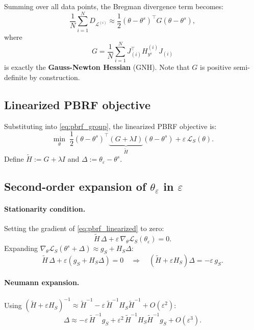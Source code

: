 \documentclass{article}
\theoremstyle{plain}
\theoremstyle{definition}
\theoremstyle{remark}
\begin{document}
Summing over all data points, the Bregman divergence term becomes:
\[
\frac{1}{N}\sum_{i=1}^{N} D_{\mathcal{L}^{(i)}} \approx \frac{1}{2}(\theta - \theta^s)^\top G (\theta - \theta^s),
\]
where
\begin{equation}
G = \frac{1}{N}\sum_{i=1}^{N} J_{(i)}^\top H_{y^s}^{(i)} J_{(i)}
\label{eq:gnh_from_bregman}
\end{equation}
is exactly the \textbf{Gauss-Newton Hessian} (GNH).
Note that $G$ is positive semi-definite by construction.

\subsection{Linearized PBRF objective}

Substituting into \eqref{eq:pbrf_group}, the linearized PBRF objective is:
\begin{equation}
\min_{\theta} \;\frac{1}{2}(\theta - \theta^s)^\top \underbrace{(G + \lambda I)}_{\tilde{H}} (\theta - \theta^s)
+ \varepsilon\,\mathcal{L}_S(\theta).
\label{eq:pbrf_linearized}
\end{equation}
Define $\tilde{H} := G + \lambda I$ and $\Delta := \theta_\varepsilon - \theta^s$.

\subsection{Second-order expansion of $\theta_\varepsilon$ in $\varepsilon$}

\paragraph{Stationarity condition.}
Setting the gradient of \eqref{eq:pbrf_linearized} to zero:
\[
\tilde{H}\,\Delta + \varepsilon\,\nabla_\theta \mathcal{L}_S(\theta_\varepsilon) = 0.
\]
Expanding $\nabla_\theta \mathcal{L}_S(\theta^s + \Delta) \approx g_S + H_S \Delta$:
\[
\tilde{H}\,\Delta + \varepsilon(g_S + H_S \Delta) = 0
\quad\Longrightarrow\quad
(\tilde{H} + \varepsilon H_S)\Delta = -\varepsilon\, g_S.
\]

\paragraph{Neumann expansion.}
Using $(\tilde{H} + \varepsilon H_S)^{-1} \approx \tilde{H}^{-1} - \varepsilon\,\tilde{H}^{-1} H_S \tilde{H}^{-1} + O(\varepsilon^2)$:
\begin{equation}
\Delta \approx -\varepsilon\,\tilde{H}^{-1} g_S + \varepsilon^2\,\tilde{H}^{-1} H_S \tilde{H}^{-1} g_S + O(\varepsilon^3).
\label{eq:delta_pbrf}
\end{equation}
\end{document}
